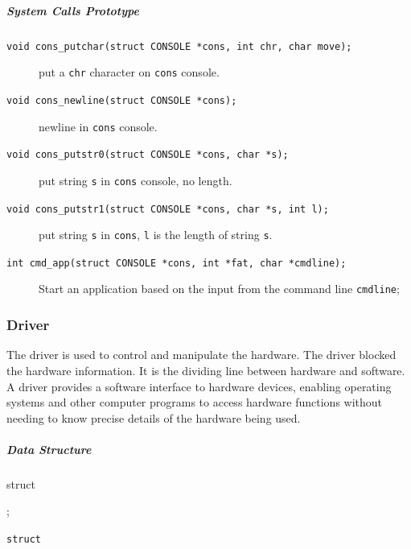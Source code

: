 \documentclass{swfcthesis}
\begin{document}
  
\subparagraph{System Calls Prototype}

\begin{description}
  
\item[\texttt{void cons_putchar(struct CONSOLE *cons, int chr, char move);}] put a
  \texttt{chr} character on \texttt{cons} console.
  
\item[\texttt{void cons_newline(struct CONSOLE *cons);}] newline in \texttt{cons}
  console.
    
\item[\texttt{void cons_putstr0(struct CONSOLE *cons, char *s);}] put string
  \texttt{s} in \texttt{cons} console, no length.

\item[\texttt{void cons_putstr1(struct CONSOLE *cons, char *s, int l);}] put string
  \texttt{s} in \texttt{cons}, \texttt{l} is the length of string \texttt{s}.
    
\item[\texttt{int cmd_app(struct CONSOLE *cons, int *fat, char *cmdline);}] Start
  an application based on the input from the command line \texttt{cmdline};
  
    
\end{description}




\subsubsection{Driver}
\label{sec:driver}
The driver is used to control and manipulate the hardware. The driver blocked the hardware
information. It is the dividing line between hardware and software. A driver provides a
software interface to hardware devices, enabling operating systems and other computer
programs to access hardware functions without needing to know precise details of the
hardware being used.


  
\subparagraph{Data Structure}

\paragraph{}

\begin{listing}[H]
  \begin{codeblock}
\begin{ccode}
struct 
{ 
  
};
\end{ccode}
  \end{codeblock}
  \caption{\texttt{struct }}\label{src:}
\end{listing}
\end{document}
